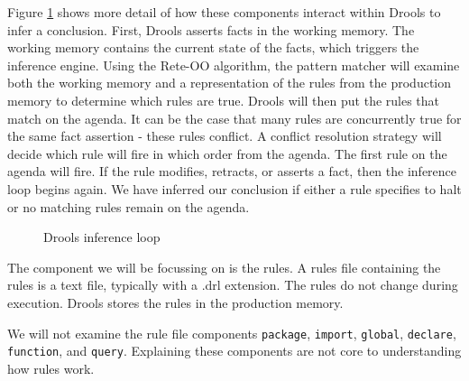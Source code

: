 Figure \ref{fig:Drools_inference_loop} shows more detail of how these components interact within Drools to infer a conclusion.
First, Drools asserts facts in the working memory.
The working memory contains the current state of the facts, which triggers the inference engine.
Using the Rete-OO algorithm, the pattern matcher will examine both the working memory and a representation of the rules from the production memory to determine which rules are true.
Drools will then put the rules that match on the agenda.
It can be the case that many rules are concurrently true for the same fact assertion - these rules conflict.
A conflict resolution strategy will decide which rule will fire in which order from the agenda.
The first rule on the agenda will fire.
If the rule modifies, retracts, or asserts a fact, then the inference loop begins again.
We have inferred our conclusion if either a rule specifies to halt or no matching rules remain on the agenda.

\begin{figure}[h]
    \centering
    \caption{Drools inference loop}
    \label{fig:Drools_inference_loop}
\end{figure}

The component we will be focussing on is the rules.
A rules file containing the rules is a text file, typically with a .drl extension.
The rules do not change during execution.
Drools stores the rules in the production memory.

\newpage 

We will not examine the rule file components \texttt{package}, \texttt{import}, \texttt{global}, \texttt{declare}, \texttt{function}, and \texttt{query}.
Explaining these components are not core to understanding how rules work.

